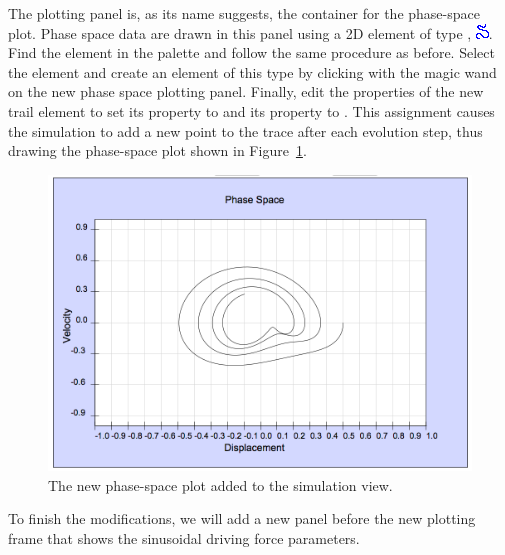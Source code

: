 The plotting panel is, as its name suggests, the container for the phase-space plot. Phase space data are drawn in this
panel using a 2D element of type , \includegraphics[scale=\linescale]{../_common/icons_png/Elements/Trail.png}.  Find the
 element in the  palette and follow the same procedure as before.  Select the
 element and create an element of this type by clicking with the magic wand on the new phase space plotting panel.
Finally, edit the properties of the new trail element to set its  property to  and its
 property to . This assignment causes the simulation to add a new  point to the
trace after each evolution step, thus drawing the phase-space plot shown in Figure~\ref{fig:03ExplorationJavascript/ModifyRunning}.

\begin{figure}[htb]
  \centering
  \includegraphics[scale=\scale]{03ExplorationJavascript/images/ModifyRunning.png}
  \caption{The new phase-space plot added to the simulation view.}
  \label{fig:03ExplorationJavascript/ModifyRunning}
\end{figure}

To finish the modifications, we will add a new panel before the new plotting frame that shows the sinusoidal driving force parameters.

